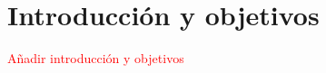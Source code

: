 \chapter*{Introducción y objetivos}


\textcolor{red}{Añadir introducción y objetivos}


\begin{comment}

La introducción deberá:
- Contextualizar el trabajo explicando antecedentes importantes para el desarrollo realizado y efectuando, en su caso, un estudio de los progresos recientes.
- Describir el problema abordado, de forma que el lector tenga desde este momento una idea clara de la cuestión a resolver o del producto  a desarrollar y una  visión general de la solución alcanzada.
- Exponer con claridad las técnicas y áreas matemáticas, así como los conceptos y herramientas de la ingeniería informática que se han empleado.
- Sintetizar el contenido de la memoria.
- Citar las principales fuentes consultadas.

Objetivos del trabajo:
- En  este apartado deberán aparecer con claridad los objetivos inicialmente previstos en la propuesta de TFG y los finalmente alcanzados con indicación de  dificultades, cambios y mejoras respecto a la propuesta inicial. Si procede, es conveniente apuntar de manera precisalas interdependencias entre los distintos objetivos y conectarlos con los diferentes apartadosde la memoria. 
Se pueden destacar aquí los aspectos formativos previos más utilizados.
\end{comment}



